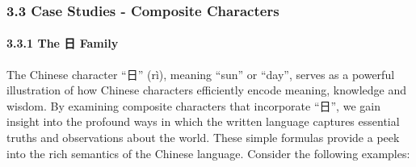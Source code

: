 \documentclass[
]{article}
\begin{document}
\subsubsection{3.3 Case Studies - Composite
Characters}\label{case-studies---composite-characters}

\paragraph{3.3.1 The 日 Family}\label{the-ux65e5-family}

The Chinese character ``日'' (rì), meaning ``sun'' or ``day'', serves as
a powerful illustration of how Chinese characters efficiently encode
meaning, knowledge and wisdom. By examining composite characters that
incorporate ``日'', we gain insight into the profound ways in which the
written language captures essential truths and observations about the
world. These simple formulas provide a peek into the rich semantics of
the Chinese language. Consider the following examples:
\end{document}

